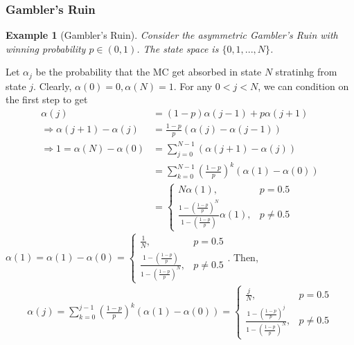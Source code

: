 \documentclass[11pt,a4paper]{article}
\newtheorem{example}{Example}
\begin{document}
\subsubsection{Gambler's Ruin}
\begin{example}[Gambler's Ruin]
    Consider the asymmetric Gambler's Ruin with winning probability $p\in (0,1)$. The state space is $\{0,1,...,N\}$.
\end{example}
Let $\alpha_j$ be the probability that the MC get absorbed in state $N$ stratinhg from state $j$. Clearly, $\alpha(0)=0,\alpha(N)=1$. For any $0<j<N$, we can condition on the first step to get
\begin{equation}
    \begin{aligned}
        \alpha(j)&=(1-p)\alpha(j-1)+p\alpha(j+1)\\
        \Rightarrow \alpha(j+1)-\alpha(j)&=\frac{1-p}{p}(\alpha(j)-\alpha(j-1))\\
        \Rightarrow 1=\alpha(N)-\alpha(0)&=\sum_{j=0}^{N-1}(\alpha(j+1)-\alpha(j))\\
        &=\sum_{k=0}^{N-1}\left(\frac{1-p}{p}\right)^k(\alpha(1)-\alpha(0))\\
        &=\left\{\begin{matrix}
            N\alpha(1),&p=0.5\\
            \frac{1-\left(\frac{1-p}{p}\right)^{N}}{1-\left(\frac{1-p}{p}\right)}\alpha(1),&p\neq 0.5
        \end{matrix}\right.
    \end{aligned}
    \nonumber
\end{equation}
$\alpha(1)=\alpha(1)-\alpha(0)=\left\{\begin{matrix}
    \frac{1}{N},&p=0.5\\
    \frac{1-\left(\frac{1-p}{p}\right)}{1-\left(\frac{1-p}{p}\right)^N},&p\neq 0.5
\end{matrix}\right.$. Then,
\begin{equation}
    \begin{aligned}
        \alpha(j)=\sum_{k=0}^{j-1}\left(\frac{1-p}{p}\right)^k(\alpha(1)-\alpha(0))=\left\{\begin{matrix}
            \frac{j}{N},&p=0.5\\
            \frac{1-\left(\frac{1-p}{p}\right)^{j}}{1-\left(\frac{1-p}{p}\right)^N},&p\neq 0.5
        \end{matrix}\right.
    \end{aligned}
    \nonumber
\end{equation}
\end{document}
